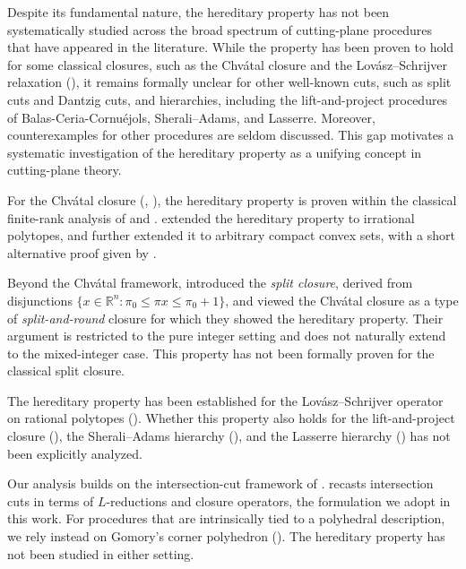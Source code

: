 \documentclass{article}
\newcommand{\R}{\mathbb{R}}
\begin{document}
Despite its fundamental nature, the hereditary property has not been systematically studied across the broad spectrum of cutting-plane procedures that have appeared in the literature. While the property has been proven to hold for some classical closures, such as the Chv\'atal closure and the Lov\'asz--Schrijver relaxation (\cite{dash2001matrix}), it remains formally unclear for other well-known cuts, such as split cuts and Dantzig cuts, and hierarchies, including the lift-and-project procedures of Balas-Ceria-Cornu\'ejols, Sherali–Adams, and Lasserre.
Moreover, counterexamples for other procedures are seldom discussed.
This gap motivates a systematic investigation of the hereditary property as a unifying concept in cutting-plane theory.

For the Chv\'atal closure (\cite{gomory1958outline}, \cite{chvatal1973edmonds}), the hereditary property is proven within the classical finite-rank analysis of \cite{schrijver1980cutting} and \cite{cook1990chvatal}. \cite{dunkel2013gomory} extended the hereditary property to irrational polytopes, and \cite{dadush2014chvatal} further extended it to arbitrary compact convex sets, with a short alternative proof given by \cite{braun2014short}.

Beyond the Chv\'atal framework, \cite{cook1990chvatal} introduced the \emph{split closure}, derived from disjunctions $\{x \in \R^n: \pi_0 \leq \pi x \leq \pi_0 + 1\}$, and viewed the Chv\'atal closure as a type of \emph{split-and-round} closure for which they showed the hereditary property. Their argument is restricted to the pure integer setting and does not naturally extend to the mixed-integer case. This property has not been formally proven for the classical split closure.

The hereditary property has been established for the Lov\'asz--Schrijver operator on rational polytopes (\cite{dash2001matrix}). Whether this property also holds for the lift-and-project closure (\cite{balas1993lift}), the Sherali--Adams hierarchy (\cite{sherali1990hierarchy}), and the Lasserre hierarchy (\cite{lasserre2001explicit}) has not been explicitly analyzed.

 

Our analysis builds on the intersection-cut framework of \cite{balas1971intersection}. \cite{averkov2012finitely} recasts intersection cuts in terms of $L$-reductions and closure operators, the formulation we adopt in this work. For procedures that are intrinsically tied to a polyhedral description, we rely instead on Gomory's corner polyhedron (\cite{gomory1969some}). The hereditary property has not been studied in either setting.
\end{document}
